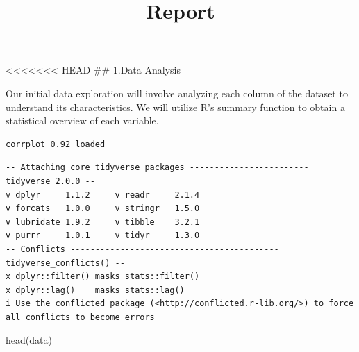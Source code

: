\documentclass[
  a4paperpaper,
  DIV=11,
  numbers=noendperiod]{scrartcl}
\title{Report}
\author{}
\date{}
\newenvironment{Shaded}{}{}
\newcommand{\FunctionTok}[1]{\textcolor[rgb]{0.39,0.29,0.61}{#1}}
\newcommand{\NormalTok}[1]{\textcolor[rgb]{0.12,0.11,0.11}{#1}}
\renewcommand*\contentsname{Table of contents}
\newcommand\contentsname{Table of contents}
\begin{document}
\maketitle
\ifdefined\Shaded\renewenvironment{Shaded}{\begin{tcolorbox}[frame hidden, enhanced, breakable, sharp corners, borderline west={3pt}{0pt}{shadecolor}, boxrule=0pt, interior hidden]}{\end{tcolorbox}}\fi

\renewcommand*\contentsname{Table of contents}
{
\hypersetup{linkcolor=}
\setcounter{tocdepth}{3}
\tableofcontents
}
\textless\textless\textless\textless\textless\textless\textless{} HEAD
\#\# 1.Data Analysis

Our initial data exploration will involve analyzing each column of the
dataset to understand its characteristics. We will utilize R's summary
function to obtain a statistical overview of each variable.

\begin{verbatim}
corrplot 0.92 loaded
\end{verbatim}

\begin{verbatim}
-- Attaching core tidyverse packages ------------------------ tidyverse 2.0.0 --
v dplyr     1.1.2     v readr     2.1.4
v forcats   1.0.0     v stringr   1.5.0
v lubridate 1.9.2     v tibble    3.2.1
v purrr     1.0.1     v tidyr     1.3.0
-- Conflicts ------------------------------------------ tidyverse_conflicts() --
x dplyr::filter() masks stats::filter()
x dplyr::lag()    masks stats::lag()
i Use the conflicted package (<http://conflicted.r-lib.org/>) to force all conflicts to become errors
\end{verbatim}

\begin{Shaded}
\begin{Highlighting}[]
\FunctionTok{head}\NormalTok{(data)}
\end{Highlighting}
\end{Shaded}
\end{document}

